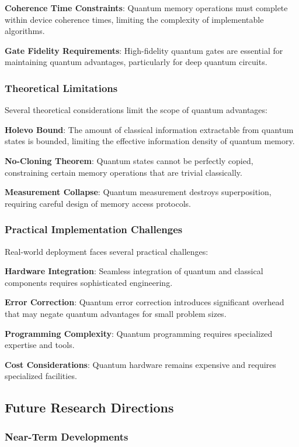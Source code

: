 \textbf{Coherence Time Constraints}: Quantum memory operations must complete within device coherence times, limiting the complexity of implementable algorithms.

\textbf{Gate Fidelity Requirements}: High-fidelity quantum gates are essential for maintaining quantum advantages, particularly for deep quantum circuits.

\subsubsection{Theoretical Limitations}

Several theoretical considerations limit the scope of quantum advantages:

\textbf{Holevo Bound}: The amount of classical information extractable from quantum states is bounded, limiting the effective information density of quantum memory.

\textbf{No-Cloning Theorem}: Quantum states cannot be perfectly copied, constraining certain memory operations that are trivial classically.

\textbf{Measurement Collapse}: Quantum measurement destroys superposition, requiring careful design of memory access protocols.

\subsubsection{Practical Implementation Challenges}

Real-world deployment faces several practical challenges:

\textbf{Hardware Integration}: Seamless integration of quantum and classical components requires sophisticated engineering.

\textbf{Error Correction}: Quantum error correction introduces significant overhead that may negate quantum advantages for small problem sizes.

\textbf{Programming Complexity}: Quantum programming requires specialized expertise and tools.

\textbf{Cost Considerations}: Quantum hardware remains expensive and requires specialized facilities.

\subsection{Future Research Directions}

\subsubsection{Near-Term Developments}


